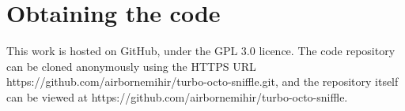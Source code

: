 \documentclass[format=sigconf,review=true]{acmart}
\begin{document}
\section{Obtaining the code}
This work is hosted on GitHub, under the GPL 3.0 licence. The code
repository can be cloned anonymously using the HTTPS URL
https://github.com/airbornemihir/turbo-octo-sniffle.git, and the
repository itself can be viewed at
https://github.com/airbornemihir/turbo-octo-sniffle.



\end{document}
